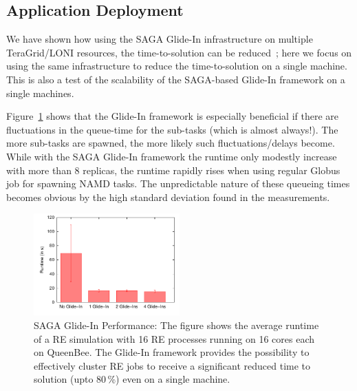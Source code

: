 \documentclass{llncs}
\begin{document}
\up

\subsection{Application Deployment}

\up


We have shown how using the SAGA Glide-In infrastructure on multiple
TeraGrid/LONI resources, the time-to-solution can be
reduced~\cite{Luckow:2008la}; here we focus on using the same
infrastructure to reduce the time-to-solution on a single machine.
This is also a test of the scalability of the SAGA-based Glide-In
framework on a single machines. %

Figure~\ref{fig:perf_remd_glidin} shows that the Glide-In framework is
especially beneficial if there are fluctuations in the queue-time for
the sub-tasks (which is almost always!). The more sub-tasks are
spawned, the more likely such fluctuations/delays become. While with
the SAGA Glide-In framework the runtime only modestly increase with
more than 8 replicas, the runtime rapidly rises when using regular
Globus job for spawning NAMD tasks. The unpredictable nature of these
queueing times becomes obvious by the high standard deviation found in
the measurements.


\begin{figure}[htbp]
        \includegraphics[width=0.5\textwidth]{perf_glidein.pdf}
        \caption{SAGA Glide-In Performance: The figure shows the
          average runtime of a RE simulation with 16 RE processes
          running on 16 cores each on QueenBee.  The Glide-In
          framework provides the possibility to effectively cluster RE
          jobs to receive a significant reduced time to solution (upto
          80\,\%) even on a single machine.}
    \label{fig:perf_remd_glidin}
\end{figure}
\end{document}
